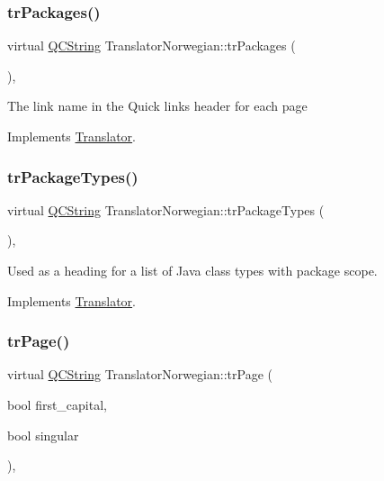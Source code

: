 \subsubsection{\texorpdfstring{trPackages()}{trPackages()}}
{\footnotesize\ttfamily virtual \mbox{\hyperlink{class_q_c_string}{Q\+C\+String}} Translator\+Norwegian\+::tr\+Packages (\begin{DoxyParamCaption}{ }\end{DoxyParamCaption})\hspace{0.3cm}{\ttfamily [inline]}, {\ttfamily [virtual]}}

The link name in the Quick links header for each page 

Implements \mbox{\hyperlink{class_translator}{Translator}}.

\mbox{\label{class_translator_norwegian_ace11863f9cec6224bb4f532e27c5d47d}} 
\subsubsection{\texorpdfstring{trPackageTypes()}{trPackageTypes()}}
{\footnotesize\ttfamily virtual \mbox{\hyperlink{class_q_c_string}{Q\+C\+String}} Translator\+Norwegian\+::tr\+Package\+Types (\begin{DoxyParamCaption}{ }\end{DoxyParamCaption})\hspace{0.3cm}{\ttfamily [inline]}, {\ttfamily [virtual]}}

Used as a heading for a list of Java class types with package scope. 

Implements \mbox{\hyperlink{class_translator}{Translator}}.

\mbox{\label{class_translator_norwegian_a9b294332989e3394163b0631a9f09759}} 
\subsubsection{\texorpdfstring{trPage()}{trPage()}}
{\footnotesize\ttfamily virtual \mbox{\hyperlink{class_q_c_string}{Q\+C\+String}} Translator\+Norwegian\+::tr\+Page (\begin{DoxyParamCaption}\item[{bool}]{first\+\_\+capital,  }\item[{bool}]{singular }\end{DoxyParamCaption})\hspace{0.3cm}{\ttfamily [inline]}, {\ttfamily [virtual]}}

